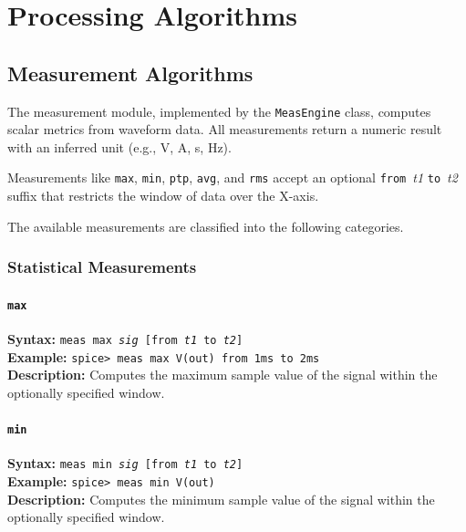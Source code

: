 
\section{Processing Algorithms}
\label{sec:pp-algorithms}
\subsection{Measurement Algorithms}
\label{sec:pp-meas}

The measurement module, implemented by the \texttt{MeasEngine} class, computes scalar metrics from waveform data. All measurements return a numeric result with an inferred unit (e.g., \si{\volt}, \si{\ampere}, \si{\second}, \si{\hertz}).

Measurements like \texttt{max}, \texttt{min}, \texttt{ptp}, \texttt{avg}, and \texttt{rms} accept an optional \texttt{from}~\textit{t1} \texttt{to}~\textit{t2} suffix that restricts the window of data over the X-axis.

The available measurements are classified into the following categories.

\subsubsection{Statistical Measurements}

\paragraph{\texttt{max}}
\textbf{Syntax:} \texttt{meas max \textit{sig} [from \textit{t1} to \textit{t2}]}\\
\textbf{Example:} \texttt{spice> meas max V(out) from 1ms to 2ms}\\
\textbf{Description:} Computes the maximum sample value of the signal within the optionally specified window.

\paragraph{\texttt{min}}
\textbf{Syntax:} \texttt{meas min \textit{sig} [from \textit{t1} to \textit{t2}]}\\
\textbf{Example:} \texttt{spice> meas min V(out)}\\
\textbf{Description:} Computes the minimum sample value of the signal within the optionally specified window.

